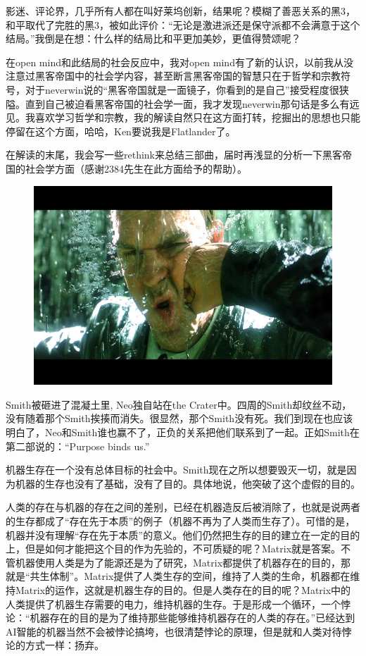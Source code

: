 \documentclass[UTF8]{ctexart}
\begin{document}
影迷、评论界，几乎所有人都在叫好莱坞创新，结果呢？模糊了善恶关系的黑3，和平取代了完胜的黑3，被如此评价：“无论是激进派还是保守派都不会满意于这个结局。”我倒是在想：什么样的结局比和平更加美妙，更值得赞颂呢？

在open mind和此结局的社会反应中，我对open mind有了新的认识，以前我从没注意过黑客帝国中的社会学内容，甚至断言黑客帝国的智慧只在于哲学和宗教符号，对于neverwin说的“黑客帝国就是一面镜子，你看到的是自己”接受程度很狭隘。直到自己被迫看黑客帝国的社会学一面，我才发现neverwin那句话是多么有远见。我喜欢学习哲学和宗教，我的解读自然只在这方面打转，挖掘出的思想也只能停留在这个方面，哈哈，Ken要说我是Flatlander了。

在解读的末尾，我会写一些rethink来总结三部曲，届时再浅显的分析一下黑客帝国的社会学方面（感谢2384先生在此方面给予的帮助）。

\begin{figure}[htb]
\centering
\includegraphics[width=0.5\linewidth]{fig/1263a08b2c62f97c9f2fb47f.jpg}
\end{figure}

Smith被砸进了混凝土里, Neo独自站在the Crater中。四周的Smith却纹丝不动，没有随着那个Smith挨揍而消失。很显然，那个Smith没有死。我们到现在也应该明白了，Neo和Smith谁也赢不了，正负的关系把他们联系到了一起。正如Smith在第二部说的：“Purpose binds us.”

机器生存在一个没有总体目标的社会中。Smith现在之所以想要毁灭一切，就是因为机器的生存也没有了基础，没有了目的。具体地说，他突破了这个虚假的目的。

人类的存在与机器的存在之间的差别，已经在机器造反后被消除了，也就是说两者的生存都成了“存在先于本质”的例子（机器不再为了人类而生存了）。可惜的是，机器并没有理解“存在先于本质”的意义。他们仍然把生存的目的建立在一定的目的上，但是如何才能把这个目的作为先验的，不可质疑的呢？Matrix就是答案。不管机器使用人类是为了能源还是为了研究，Matrix都提供了机器存在的目的，那就是“共生体制”。Matrix提供了人类生存的空间，维持了人类的生命，机器都在维持Matrix的运作，这就是机器生存的目的。但是人类存在的目的呢？Matrix中的人类提供了机器生存需要的电力，维持机器的生存。于是形成一个循环，一个悖论：“机器存在的目的是为了维持那些能够维持机器存在的人类的存在。”已经达到AI智能的机器当然不会被悖论搞垮，也很清楚悖论的原理，但是就和人类对待悖论的方式一样：扬弃。
\end{document}
